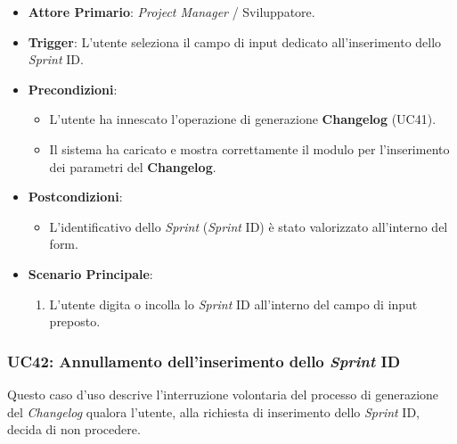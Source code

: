 \documentclass[12pt, a4paper]{article}
\begin{document}
\begin{itemize}
    \item \textbf{Attore Primario}: \textit{Project Manager} / Sviluppatore.
    
    \item \textbf{Trigger}: L'utente seleziona il campo di input dedicato all'inserimento dello \textit{Sprint} ID.
    
    \item \textbf{Precondizioni}:
    \begin{itemize}
        \item L'utente ha innescato l'operazione di generazione \textbf{Changelog} (UC41).
        \item Il sistema ha caricato e mostra correttamente il modulo per l'inserimento dei parametri del \textbf{Changelog}.
    \end{itemize}
    
    \item \textbf{Postcondizioni}:
    \begin{itemize}
        \item L'identificativo dello \textit{Sprint} (\textit{Sprint} ID) è stato valorizzato all'interno del form.
    \end{itemize}
    
    \item \textbf{Scenario Principale}:
    \begin{enumerate}
        \item L'utente digita o incolla lo \textit{Sprint} ID all'interno del campo di input preposto.
    \end{enumerate}
\end{itemize}

\subsubsection{UC42: Annullamento dell'inserimento dello \textit{Sprint} ID}\label{uc:42}
Questo caso d'uso descrive l'interruzione volontaria del processo di generazione del \textit{Changelog} qualora l'utente, alla richiesta di inserimento dello \textit{Sprint} ID, decida di non procedere.
\end{document}
